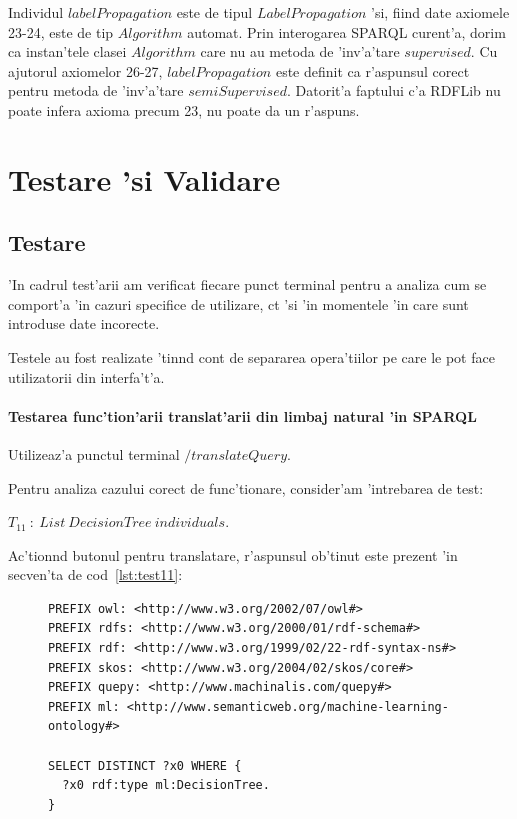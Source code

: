 \documentclass[12pt,a4paper,twoside]{report}
\begin{document}
Individul $labelPropagation$ este de tipul $LabelPropagation$ 'si, fiind date axiomele 23-24, este de tip $Algorithm$ automat. Prin interogarea SPARQL curent'a, dorim ca instan'tele clasei $Algorithm$ care nu au metoda de 'inv'a'tare $supervised$. Cu ajutorul axiomelor 26-27, $labelPropagation$ este definit ca r'aspunsul corect pentru metoda de 'inv'a'tare $semiSupervised$.
Datorit'a faptului c'a RDFLib nu poate infera axioma precum 23, nu poate da un r'aspuns.

\chapter{Testare 'si Validare}\label{sec:testing}

\section{Testare}
'In cadrul test'arii am verificat fiecare punct terminal pentru a analiza cum se comport'a 'in cazuri specifice de utilizare, c\ia t 'si 'in momentele 'in care sunt introduse date incorecte.

Testele au fost realizate 'tin\ia nd cont de separarea opera'tiilor pe care le pot face utilizatorii din interfa't'a.

\subsubsection{Testarea func'tion'arii translat'arii din limbaj natural 'in SPARQL}

Utilizeaz'a punctul terminal $/translateQuery$. 

Pentru analiza cazului corect de func'tionare, consider'am 'intrebarea de test:
\begin{center}
$T_{11}\ :\ List\ DecisionTree\ individuals$.
\end{center}

Ac'tion\ia nd butonul pentru translatare, r'aspunsul ob'tinut este prezent 'in secven'ta de cod~\ref{lst:test11}:

\begin{figure}[h]
\begin{footnotesize}
\begin{lstlisting}[captionpos=b, caption=R'aspuns SPARQL pentru T_{11}, label=lst:test11,  basicstyle=\ttfamily,frame=single]
PREFIX owl: <http://www.w3.org/2002/07/owl#>
PREFIX rdfs: <http://www.w3.org/2000/01/rdf-schema#>
PREFIX rdf: <http://www.w3.org/1999/02/22-rdf-syntax-ns#>
PREFIX skos: <http://www.w3.org/2004/02/skos/core#>
PREFIX quepy: <http://www.machinalis.com/quepy#>
PREFIX ml: <http://www.semanticweb.org/machine-learning-ontology#>

SELECT DISTINCT ?x0 WHERE {
  ?x0 rdf:type ml:DecisionTree.
}
\end{lstlisting}
\end{footnotesize}
\end{figure}
\end{document}
